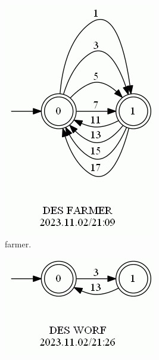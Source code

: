 \documentclass{article}
\begin{document}
\begin{figure}[h!]
  \centering
  \begin{subfigure}[b]{0.2\linewidth}
    \includegraphics[width=\linewidth]{assets/FARMER.jpg}
     \caption{farmer.}
  \end{subfigure}
  \begin{subfigure}[b]{0.2\linewidth}
    \includegraphics[width=\linewidth]{assets/WORF.jpg}

\end{subfigure}
\end{figure}
\end{document}
